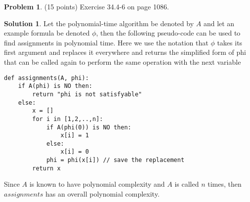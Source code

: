 \documentclass{article}
\theoremstyle{definition}
\newtheorem{problem}{Problem}
\newtheorem*{solution}{Solution}
\begin{document}
\begin{problem} (15 points) %
Exercise 34.4-6 on page 1086. 
\end{problem}
\begin{solution}
Let the polynomial-time algorithm be denoted by $A$ and let an example formula be denoted $\phi$, then the following pseudo-code can be used to find assignments in polynomial time. Here we use the notation that $\phi$ takes its first argument and replaces it everywhere and returns the simplified form of phi that can be called again to perform the same operation with the next variable\\
\begin{verbatim}
def assignments(A, phi):
    if A(phi) is NO then:
        return "phi is not satisfyable"
    else:
        x = []
        for i in [1,2,..,n]:
            if A(phi(0)) is NO then:
                x[i] = 1
            else:
                x[i] = 0
            phi = phi(x[i]) // save the replacement
        return x
\end{verbatim}
Since $A$ is known to have polynomial complexity and $A$ is called $n$ times, then $assignments$ has an overall polynomial complexity.
\end{solution}
\end{document}

